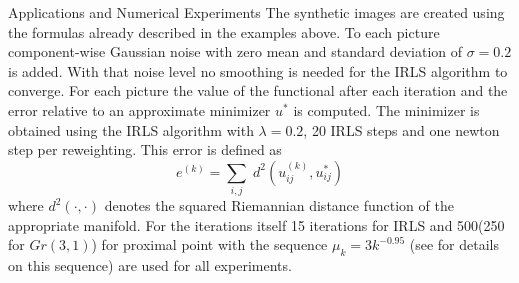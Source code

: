 \begin{chapter}{Applications and Numerical Experiments}
The synthetic images are created using the formulas already described in the examples above. To each picture component-wise Gaussian noise with zero mean and
standard deviation of $\sigma=0.2$ is added. With that noise level no smoothing is needed for the IRLS algorithm to converge. 
For each picture the value of the functional after each iteration and the error relative to an approximate minimizer $u^*$ is computed.
The minimizer is obtained using the IRLS algorithm with $\lambda=0.2$, 20 IRLS steps and one newton step per reweighting. This error is defined as
\begin{equation}
e^{(k)}=\sum_{i,j}\;d^2(u^{(k)}_{ij},u^*_{ij})
\end{equation}
where $d^2(\cdot,\cdot)$ denotes the squared Riemannian distance function of the appropriate manifold. For the iterations itself 15 iterations for IRLS and 500(250 for $Gr(3,1)$) for proximal point with
the sequence $\mu_k=3k^{-0.95}$ (see \cite{Weinmann} for details on this sequence) are used for all experiments. \\


\end{chapter}
